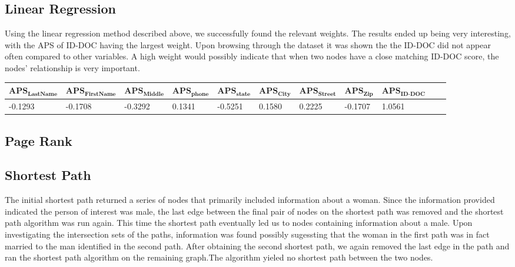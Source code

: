\documentclass{article} %
\begin{document}
\subsection{Linear Regression}
Using the linear regression method described above, we successfully found the relevant weights. The results ended up being very interesting, with the APS of ID-DOC having the largest weight. Upon browsing through the dataset it was shown the the ID-DOC did not appear often compared to other variables. A high weight would possibly indicate that when two nodes have a close matching ID-DOC score, the nodes' relationship is very important. 
\begin{table}[h]
\centering
\tiny
\begin{tabular}{|l|l|l|l|l|l|l|l|l|l|l|}
\hline

 $\textbf{APS}_{\textbf{LastName}}$ & $\textbf{APS}_{\textbf{FirstName}}$ &  $\textbf{APS}_{\textbf{Middle}}$ &$\textbf{APS}_{\textbf{phone}}$ & $\textbf{APS}_{\textbf{state}}$ & $\textbf{APS}_{\textbf{City}}$ & $\textbf{APS}_{\textbf{Street}}$ & $\textbf{APS}_{\textbf{Zip}}$ & $\textbf{APS}_{\textbf{ID-DOC}}$   \\ \hline

-0.1293 & -0.1708 &  -0.3292 &0.1341 & -0.5251 & 0.1580 &  0.2225 & -0.1707 & 1.0561  \\ \hline
\end{tabular}
\end{table}

\subsection{Page Rank}

\subsection{Shortest Path}
The initial shortest path returned a series of nodes that primarily included information about a woman. Since the information provided indicated the person of interest was male, the last edge between the final pair of nodes on the shortest path was removed and the shortest path algorithm was run again. This time the shortest path eventually led us to nodes containing information about a male. Upon investigating the intersection sets of the paths, information was found possibly sugessting that the woman in the first path was in fact married to the man identified in the second path. After obtaining the second shortest path, we again removed the last edge in the path and ran the shortest path algorithm on the remaining graph.The algorithm yieled no shortest path between the two nodes. 
\end{document}
